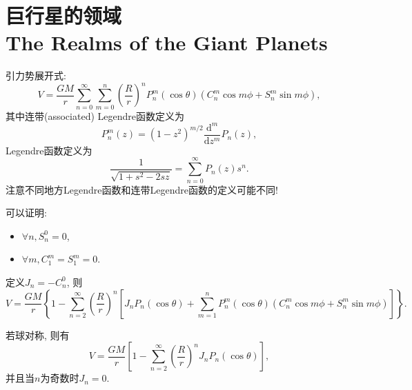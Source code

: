 \chapter{巨行星的领域\\The Realms of the Giant Planets}

引力势展开式:
\begin{equation*}
    V=\frac{GM}{r}
    \sum_{n=0}^{\infty}
    \sum_{m=0}^{n}
    \left(\frac{R}{r}\right)^n
    P_n^{m}(\cos\theta)(C_n^{m}\cos m\phi+S_n^{m}\sin m\phi),
\end{equation*}
其中连带(associated) Legendre函数定义为
\begin{equation*}
    P_n^{m}(z)=(1-z^2)^{m/2}\frac{\mathrm{d}^m}{\mathrm{d}z^m}P_n(z),
\end{equation*}
Legendre函数定义为
\begin{equation*}
    \frac{1}{\sqrt{1+s^2-2sz}}=\sum_{n=0}^{\infty}P_n(z)s^n.
\end{equation*}
注意不同地方Legendre函数和连带Legendre函数的定义可能不同!

可以证明:
\begin{itemize}
    \item $\forall n, S_n^0=0$,
    \item $\forall m, C_1^m=S_1^m=0$.
\end{itemize}
定义$J_n=-C_n^0$, 则
\begin{equation*}
    V=\frac{GM}{r}\left\{
        1
        -\sum_{n=2}^{\infty}
        \left(\frac{R}{r}\right)^n\left[
            J_nP_n(\cos\theta)
            +\sum_{m=1}^{n}
            P_n^{m}(\cos\theta)(C_n^{m}\cos m\phi+S_n^{m}\sin m\phi)
        \right]
    \right\}.
\end{equation*}

若球对称, 则有
\begin{equation*}
    V=\frac{GM}{r}\left[
        1
        -\sum_{n=2}^{\infty}
        \left(\frac{R}{r}\right)^n
        J_nP_n(\cos\theta)       
    \right],
\end{equation*}
并且当$n$为奇数时$J_n=0$.
